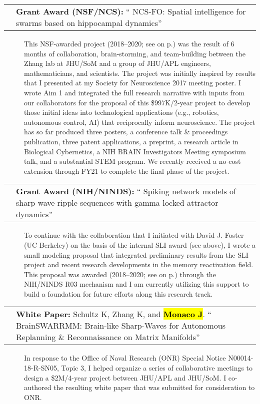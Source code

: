 \documentclass[10pt]{article}
\makeatletter
\newcommand{\unpubtitle}[1]{{\color{hopkinsblue} #1}}
\newcommand{\joehl}[1]{\hl{\textbf{#1}}}
\newcommand{\researchnote}[1]{
  \begin{description}
    \item[] {\hspace{2.2ex}\color{darkgray} #1}
  \end{description}
}
\newcommand{\researchactivity}[4]{
  \begin{minipage}[t]{\textwidth}
    \begin{tabular}{@{\hspace{2ex}}l>{\raggedright\arraybackslash}p{.8\textwidth}}
      \makebox[1.2in][l]{#1} & \textbf{#2:}
      ``\unpubtitle{#3}'' 
    \end{tabular}
  \researchnote{\hspace{1ex} #4}
  \end{minipage}
  \medbreak
}
\newcommand{\whitepaper}[4]{
  \begin{minipage}[t]{\textwidth}
    \begin{tabular}{@{\hspace{2ex}}l>{\raggedright\arraybackslash}p{.8\textwidth}}
      \makebox[1.2in][l]{#1} & \textbf{White Paper:} #2.
      ``\unpubtitle{#3}'' 
    \end{tabular}
  \researchnote{\hspace{1ex} #4}
  \end{minipage}
  \medbreak
}
\makeatother
\begin{document}
\researchactivity
{Nov. 2017--2021}
{Grant Award (NSF/NCS)}
{NCS-FO: Spatial intelligence for swarms based on hippocampal dynamics}
{This NSF-awarded project (2018--2020; see \emph{\nameref{sec:cursupport}}
  on p.\pageref{sec:cursupport}) was the result of 6 months of collaboration,
  brain-storming, and team-building between the Zhang lab at JHU/SoM and a group
  of JHU/APL engineers, mathematicians, and scientists. The project was initially
  inspired by results that I presented at my Society for Neuroscience 2017 meeting
  poster. I wrote Aim 1 and integrated the full research narrative with inputs
  from our collaborators for the proposal of this \$997K/2-year project to develop
  those initial ideas into technological applications (e.g., robotics, autonomous
  control, AI) that reciprocally inform neuroscience. The project has so far
  produced three posters, a conference talk \& proceedings publication, three
  patent applications, a preprint, a research article in Biological Cybernetics, a
  NIH BRAIN Investigators Meeting symposium talk, and a substantial STEM program.
  We recently received a no-cost extension through FY21 to complete the final
phase of the project.}
\label{sec:resnsf}

\researchactivity
{Jan. 2018--2020}
{Grant Award (NIH/NINDS)}
{Spiking network models of sharp-wave ripple sequences with gamma-locked
attractor dynamics}
{To continue with the collaboration that I initiated with David J. Foster
  (UC Berkeley) on the basis of the internal SLI award (see above), I wrote
  a small modeling proposal that integrated preliminary results from the SLI
  project and recent research developments in the memory reactivation field.
  This proposal was awarded (2018--2020; see \emph{\nameref{sec:cursupport}}
  on p.\pageref{sec:cursupport}) through the NIH/NINDS R03 mechanism and I am
  currently utilizing this support to build a foundation for future efforts along
this research track.}
\label{sec:resnih}

\whitepaper
{Feb.--Mar. 2018}
{Schultz K, Zhang K, and \joehl{Monaco J}}
{BrainSWARRMM: Brain-like Sharp-Waves for Autonomous Replanning \&
Reconnaissance on Matrix Manifolds}
{In response to the Office of Naval Research (ONR) Special Notice
  N00014-18-R-SN05, Topic 3, I helped organize a series of collaborative meetings
  to design a \$2M/4-year project between JHU/APL and JHU/SoM. I co-authored the
resulting white paper that was submitted for consideration to ONR.}
\end{document}
